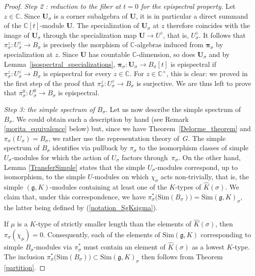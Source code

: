 \documentclass{amsart}
\theoremstyle{definition}
\begin{document}
\begin{proof}
\smallskip

\textit{Step 2 : reduction to the fiber at $t = 0$ for the epispectral property.} Let $z \in \mathbb{C}$. Since $\bm{U}_\sigma$ is a corner subalgebra of $\bm{U}$, it is in particular a direct summand of the $\mathbb{C}[t]$-module $\bm{U}$. The specialization of $\bm{U}_\sigma$ at $z$ therefore coincides with the image of $\bm{U}_\sigma$ through the specialization map $\bm{U} \to U^z$, that is, $U^z_\sigma$. It follows that $\pi_\sigma^z : U_\sigma^z \to B_\sigma$ is precisely the morphism of $\mathbb{C}$-algebras induced from $\bm{\pi}_\sigma$ by specialization at $z$. Since $\bm{U}$ has countable $\mathbb{C}$-dimension, so does $\bm{U}_\sigma$ and by Lemma~\ref{isospectral_specializations}, $\bm{\pi}_\sigma : \bm{U}_\sigma \to B_\sigma[t]$ is epispectral if $\pi_\sigma^z : U_\sigma^z \to B_\sigma$ is epispectral for every $z \in \mathbb{C}$. For $z \in \mathbb{C}^\times$, this is clear: we proved in the first step of the proof that $\pi_\sigma^z : U^z_\sigma \to B_\sigma$ is surjective. We are thus left to prove that $\pi_\sigma^0 : U_\sigma^0 \to B_\sigma$ is epispectral.

\smallskip

\textit{Step 3: the simple spectrum of $B_\sigma$}. Let us now describe the simple spectrum of~$B_\sigma$. We could obtain such a description by hand (see Remark \ref{morita_equivalence} below) but, since we have Theorem~\ref{Delorme_theorem} and $\pi_\sigma(U_\sigma) = B_\sigma$, we rather use the representation theory of~$G$. The simple spectrum of $B_\sigma$ identifies via pullback by $\pi_\sigma$ to the isomorphism classes of simple $U_\sigma$-modules for which the action of $U_\sigma$ factors through~$\pi_\sigma$. On the other hand, Lemma \ref{TransferSimple} states that the simple $U_\sigma$-modules correspond, up to isomorphism, to the simple $U$-modules on which $\chi_\sigma$ acts non-trivially, that is, the simple $(\mathfrak{g},K)$-modules containing at least one of the $K$-types of $\widehat{K}(\sigma)$. We claim that, under this correspondence, we have $\pi_\sigma^*\big(\mathrm{Sim}(B_\sigma)\big) = \mathrm{Sim}(\mathfrak{g},K)_\sigma$, the latter being defined by (\ref{notation_SgKsigma}).

If $\mu$ is a $K$-type of strictly smaller length than the elements of $\widehat{K}(\sigma)$, then $\pi_\sigma(\chi_\mu) = 0$. Consequently, each of the elements of $\mathrm{Sim}(\mathfrak{g},K)$ corresponding to simple $B_\sigma$-modules via $\pi_\sigma^*$ must contain an element of $\widehat{K}(\sigma)$ as a lowest $K$-type. The inclusion $\pi_\sigma^*\big(\mathrm{Sim}(B_\sigma)\big) \subset \mathrm{Sim}(\mathfrak{g},K)_\sigma$ then follows from Theorem \ref{partition}.


\end{proof}
\end{document}
